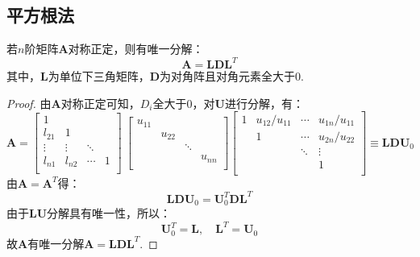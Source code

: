 \subsection{平方根法}
\begin{th4}
    若$n$阶矩阵$\boldsymbol{A}$对称正定，则有唯一分解：
    \begin{equation}
        \boldsymbol{A} = \boldsymbol{LDL}^{T}
    \end{equation}
    其中，$\boldsymbol{L}$为单位下三角矩阵，$\boldsymbol{D}$为对角阵且对角元素全大于0.
\end{th4}

\begin{proof}
    由$\boldsymbol{A}$对称正定可知，$D_i$全大于0，对$\boldsymbol{U}$进行分解，有：
    \begin{equation*}
        \boldsymbol{A} = 
        \begin{bmatrix}
            1 & \ & \ & \ \\
            l_{21} & 1 & \ & \ \\
            \vdots & \vdots & \ddots & \ \\
            l_{n1} & l_{n2} & \cdots & 1 \\ 
        \end{bmatrix} \ 
        \begin{bmatrix}
            u_{11} & \      & \      & \      \\
            \      & u_{22} & \      & \      \\
            \      & \      & \ddots & \      \\
            \      & \      & \      & u_{nn} \\
        \end{bmatrix}
        \begin{bmatrix}
            1      & u_{12}/u_{11} & \cdots & u_{1n}/u_{11} \\
            \      & 1      & \cdots & u_{2n}/u_{22} \\
            \      & \      & \ddots & \vdots \\
            \      & \      & \      & 1      \\
        \end{bmatrix} \equiv \boldsymbol{LDU}_0
    \end{equation*}
    由$\boldsymbol{A}=\boldsymbol{A}^T$得：
    \begin{equation*}
        \boldsymbol{LDU}_0 = \boldsymbol{U}_0^T \boldsymbol{DL}^T
    \end{equation*}
    由于$\boldsymbol{LU}$分解具有唯一性，所以：
    \begin{equation*}
        \boldsymbol{U}_0^T = \boldsymbol{L},\quad \boldsymbol{L}^T = \boldsymbol{U}_0
    \end{equation*}
    故$\boldsymbol{A}$有唯一分解$\boldsymbol{A}=\boldsymbol{LDL}^T$.
\end{proof}

